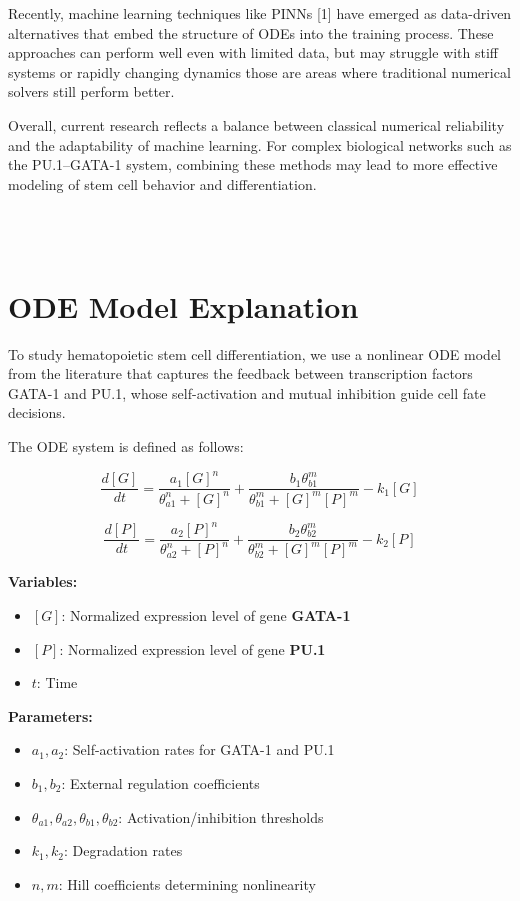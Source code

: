 \documentclass[journal]{IEEEtran}
\begin{document}
Recently, machine learning techniques like PINNs [1] have emerged as data-driven alternatives that embed the structure of ODEs into the training process. These approaches can perform well even with limited data, but may struggle with stiff systems or rapidly changing dynamics those are areas where traditional numerical solvers still perform better.

Overall, current research reflects a balance between classical numerical reliability and the adaptability of machine learning. For complex biological networks such as the PU.1–GATA-1 system, combining these methods may lead to more effective modeling of stem cell behavior and differentiation.

\\
\\
\section{ODE Model Explanation}

To study hematopoietic stem cell differentiation, we use a nonlinear ODE model from the literature that captures the feedback between transcription factors GATA-1 and PU.1, whose self-activation and mutual inhibition guide cell fate decisions.

The ODE system is defined as follows:

\begin{equation}
\frac{d[G]}{dt} = \frac{a_1 [G]^n}{\theta_{a1}^n + [G]^n} + \frac{b_1 \theta_{b1}^m}{\theta_{b1}^m + [G]^m [P]^m} - k_1 [G]
\tag{1a}
\end{equation}

\begin{equation}
\frac{d[P]}{dt} = \frac{a_2 [P]^n}{\theta_{a2}^n + [P]^n} + \frac{b_2 \theta_{b2}^m}{\theta_{b2}^m + [G]^m [P]^m} - k_2 [P]
\tag{2a}
\end{equation}

\noindent
\textbf{Variables:}
\begin{itemize}
    \item $[G]$: Normalized expression level of gene \textbf{GATA-1}
    \item $[P]$: Normalized expression level of gene \textbf{PU.1}
    \item $t$: Time
\end{itemize}

\noindent
\textbf{Parameters:}
\begin{itemize}
    \item $a_1, a_2$: Self-activation rates for GATA-1 and PU.1
    \item $b_1, b_2$: External regulation coefficients
    \item $\theta_{a1}, \theta_{a2}, \theta_{b1}, \theta_{b2}$: Activation/inhibition thresholds
    \item $k_1, k_2$: Degradation rates
    \item $n, m$: Hill coefficients determining nonlinearity
\end{itemize}
\end{document}
